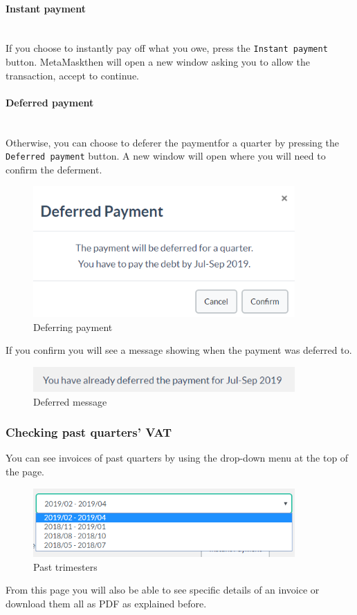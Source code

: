 			\paragraph{Instant payment} \mbox{}\\
			If you choose to instantly pay off what you owe, press the \texttt{Instant 
			payment} button. MetaMask\glosp then will open a new window asking 
			you to allow the 
			transaction, accept to continue.
			\paragraph{Deferred payment} \mbox{}\\
			Otherwise, you can choose to deferer the payment\glosp for a quarter
			 by pressing the \texttt{Deferred payment} button. A new window will open 
			 where you will need to confirm the deferment.
			\begin{figure}[H]
				\includegraphics[width=10cm]{res/images/deferred_payment.png}
				\centering
				\caption{Deferring payment}
			\end{figure}
			\noindent If you confirm you will see a message showing when the
			payment was deferred to.
			\begin{figure}[H]
				\includegraphics[width=10cm]{res/images/deferred_message.png}
				\centering
				\caption{Deferred message}
			\end{figure}
%
		\subsubsection{Checking past quarters' VAT}
		You can see invoices of past quarters by using the drop-down 
		menu at the top of the page.
		\begin{figure}[H]
			\includegraphics[width=10cm]{res/images/past_trimesters.png}
			\centering
			\caption{Past trimesters}
		\end{figure}
		\noindent From this page you will also be able to see specific details 
		of an invoice or download them all as PDF as explained before.